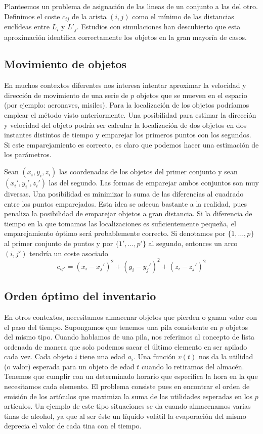 \documentclass[twoside,a4paper,openright,12pt,tikz]{book}
\begin{document}
Planteemos un problema de asignación de las lineas de un conjunto a las del otro. Definimos el coste $c_{ij}$ de la arista $(i,j)$ como el mínimo de las distancias euclídeas entre $L_i$ y $L'_j$. Estudios con simulaciones han descubierto que esta aproximación identifica correctamente los objetos en la gran mayoría de casos.


\subsection{Movimiento de objetos}
En muchos contextos diferentes nos interesa intentar aproximar la velocidad y dirección de movimiento de una serie de $p$ objetos que se mueven en el espacio (por ejemplo: aeronaves, misiles). Para la localización de los objetos podríamos emplear el método visto anteriormente. Una posibilidad para estimar la dirección y velocidad del objeto podría ser calcular la localización de dos objetos en dos instantes distintos de tiempo y emparejar los primeros puntos con los segundos. Si este emparejamiento es correcto, es claro que podemos hacer una estimación de los parámetros. 

Sean $(x_i,y_i,z_i)$ las coordenadas de los objetos del primer conjunto y sean $(x_i',y_i',z_i')$ las del segundo. Las formas de emparejar ambos conjuntos son muy diversas. Una posibilidad es minimizar la suma de las diferencias al cuadrado entre los puntos emparejados. Esta idea se adecua bastante a la realidad, pues penaliza la posibilidad de emparejar objetos a gran distancia. Si la diferencia de tiempo en la que tomamos las localizaciones es suficientemente pequeña, el emparejamiento óptimo será probablemente correcto. Si denotamos por $\{1,\dotsc,p\}$ al primer conjunto de puntos y por $\{1',\dotsc,p'\}$ al segundo, entonces un arco $(i,j')$ tendría un coste asociado 
$$
c_{ij'} = (x_i-x_j')^2+(y_i-y_j')^2+(z_i-z_j')^2
$$

\subsection{Orden óptimo del inventario}
En otros contextos, necesitamos almacenar objetos que pierden o ganan valor con el paso del tiempo. Supongamos que tenemos una pila consistente en $p$ objetos del mismo tipo. Cuando hablamos de una pila, nos referimos al concepto de lista ordenada de manera que solo podemos sacar el último elemento en ser apilado cada vez. Cada objeto $i$ tiene una edad $a_i$. Una función $v(t)$ nos da la utilidad (o valor) esperada para un objeto de edad $t$ cuando lo retiramos del almacén. Tenemos que cumplir con un determinado horario que especifica la hora en la que necesitamos cada elemento. El problema consiste pues en encontrar el orden de emisión de los artículos que maximiza la suma de las utilidades esperadas en los $p$ artículos. Un ejemplo de este tipo situaciones se da cuando almacenamos varias tinas de alcohol, ya que al ser éste un líquido volátil la evaporación del mismo deprecia el valor de cada tina con el tiempo.
\end{document}
